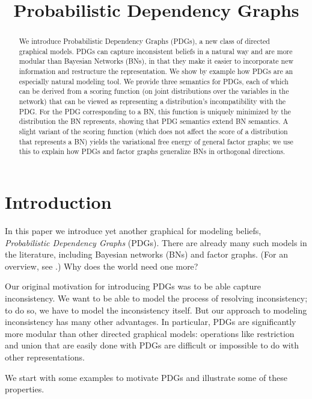 \documentclass{article}
\title{Probabilistic Dependency Graphs}
\author{} %
\theoremstyle{plain}
\theoremstyle{definition}
\theoremstyle{remark}
\numberwithin{equation}{section}
\begin{document}
\maketitle
\begin{abstract}
We introduce Probabilistic Dependency Graphs (PDGs), a new class of
directed graphical models.   PDGs can capture inconsistent beliefs in a
natural way and are more modular than Bayesian Networks (BNs), in that
they make it easier to incorporate new information and restructure the  
representation.    We show by example how PDGs are an especially natural
modeling tool.
%
We provide three semantics for PDGs, each of which can be derived from a
scoring function (on joint distributions over the
variables in the network) that can be viewed as representing a
distribution's incompatibility with the PDG. For the PDG corresponding
to a BN, this function is  uniquely minimized by the distribution the BN
represents, showing that PDG semantics extend BN semantics.
A slight variant of the scoring function (which does not affect the
score of a distribution that represents a BN) yields the variational
free energy of general factor graphs; we use this to explain how PDGs
and factor graphs generalize BNs in orthogonal directions.%
\end{abstract}

\section{Introduction}

In this paper we introduce yet another graphical for modeling beliefs,
\emph{Probabilistic Dependency Graphs} (PDGs). There are already many
such models in the literature, including Bayesian networks (BNs) and
factor graphs. (For an overview, see \cite{KF09}.)
Why does the world need one more?  

Our original motivation for introducing PDGs was to be able capture
inconsistency. We want to be able to model the process of resolving
inconsistency; to do so, we have to model the inconsistency itself. But our
approach to modeling inconsistency has many other advantages. In particular,
PDGs are significantly more modular than other directed graphical models:
operations like restriction and union that are easily done with PDGs are
difficult or impossible to do with other representations.

We start with some examples to motivate PDGs and illustrate some of these properties.  
\end{document}

